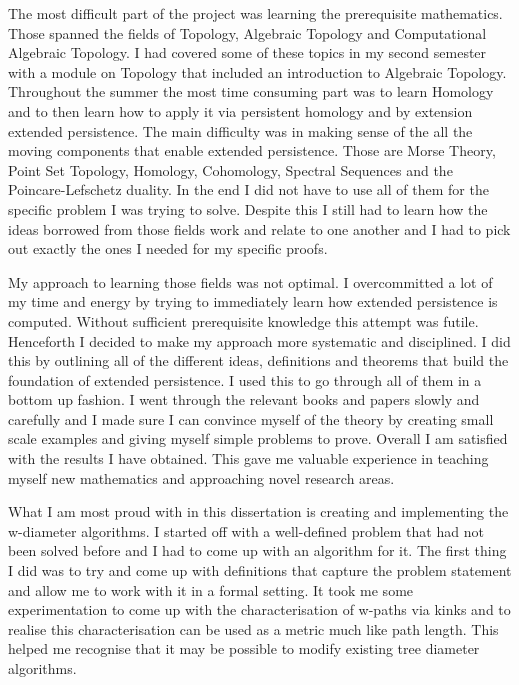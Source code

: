 The most difficult part of the project was learning the prerequisite mathematics. Those spanned the fields of  Topology, Algebraic Topology and Computational Algebraic Topology. I had covered some of these topics in my second semester with a module on Topology that included an introduction to Algebraic Topology. Throughout the summer the most time consuming part was to learn Homology and to then learn how to apply it via persistent homology and by extension extended persistence. The main difficulty was in making sense of the all the moving components that enable extended persistence. Those are Morse Theory, Point Set Topology, Homology, Cohomology, Spectral Sequences and the Poincare-Lefschetz duality. In the end I did not have to use all of them for the specific problem I was trying to solve. Despite this I still had to learn how the ideas borrowed from those fields work and relate to one another and I had to pick out exactly the ones I needed for my specific proofs.

My approach to learning those fields was not optimal. I overcommitted a lot of my time and energy by trying to immediately learn how extended persistence is computed. Without sufficient prerequisite knowledge this attempt was futile. Henceforth I decided to make my approach more systematic and disciplined. I did this by outlining all of the different ideas, definitions and theorems that build the foundation of extended persistence. I used this to go through all of them in a bottom up fashion. I went through the relevant books and papers slowly and carefully and I made sure I can convince myself of the theory by creating small scale examples and giving myself simple problems to prove. Overall I am satisfied with the results I have obtained. This gave me valuable experience in teaching myself new mathematics and approaching novel research areas.

What I am most proud with in this dissertation is creating and implementing the w-diameter algorithms. I started off with a well-defined problem that had not been solved before and I had to come up with an algorithm for it. The first thing I did was to try and come up with definitions that capture the problem statement and allow me to work with it in a formal setting. It took me some experimentation to come up with the characterisation of w-paths via kinks and to realise this characterisation can be used as a metric much like path length. This helped me recognise that it may be possible to modify existing tree diameter algorithms.

